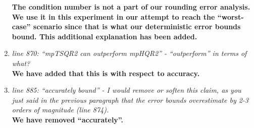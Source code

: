 \documentclass[final,onefignum,onetabnum]{siamart190516}
\begin{document}
\begin{enumerate}
    {\bf The condition number is not a part of our rounding error analysis. We use it in this experiment in our attempt to reach the ``worst-case'' scenario since that is what our deterministic error bounds bound. This additional explanation has been added. } 
    \item {\it line 870: ``mpTSQR2 can outperform mpHQR2'' - ``outperform'' in terms of what? } \\
    {\bf We have added that this is with respect to accuracy.}
    \item {\it line 885: ``accurately bound'' - I would remove or soften this claim, as you just said in the previous paragraph that the error bounds overestimate by 2-3 orders of magnitude (line 874).}\\
    {\bf We have removed ``accurately''.}
\end{enumerate}

\end{document}
